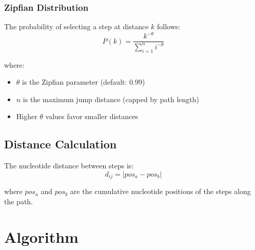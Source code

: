\documentclass{article}
\begin{document}
\subsubsection{Zipfian Distribution}

The probability of selecting a step at distance $k$ follows:
\begin{equation}
P(k) = \frac{k^{-\theta}}{\sum_{i=1}^{n} i^{-\theta}}
\end{equation}

where:
\begin{itemize}
    \item $\theta$ is the Zipfian parameter (default: 0.99)
    \item $n$ is the maximum jump distance (capped by path length)
    \item Higher $\theta$ values favor smaller distances
\end{itemize}

\subsection{Distance Calculation}

The nucleotide distance between steps is:
\begin{equation}
d_{ij} = |pos_a - pos_b|
\end{equation}

where $pos_a$ and $pos_b$ are the cumulative nucleotide positions of the steps along the path.

\section{Algorithm}
\end{document}
